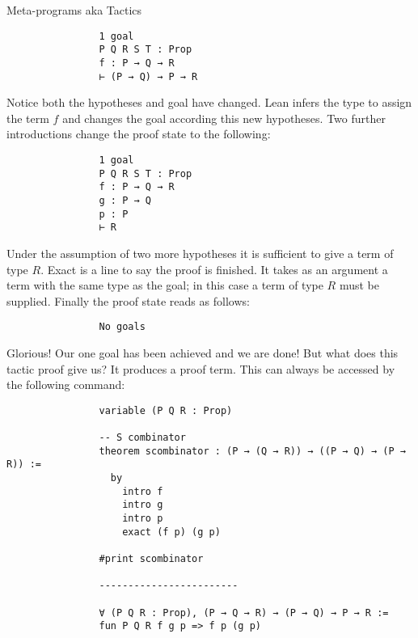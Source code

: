 \documentclass{book}
\begin{document}
\begin{eg}{Meta-programs aka Tactics}
        \begin{center}
            \begin{lstlisting}
                1 goal
                P Q R S T : Prop
                f : P → Q → R
                ⊢ (P → Q) → P → R
            \end{lstlisting}
        \end{center}

        Notice both the hypotheses and goal have changed. Lean infers the type to assign the term $f$ and changes the goal according this new hypotheses. Two further introductions change the proof state to the following: 

        \begin{center}
            \begin{lstlisting}
                1 goal
                P Q R S T : Prop
                f : P → Q → R
                g : P → Q
                p : P
                ⊢ R
            \end{lstlisting}
        \end{center}        
        
        Under the assumption of two more hypotheses it is sufficient to give a term of type $R$. Exact is a line to say the proof is finished. It takes as an argument a term with the same type as the goal; in this case a term of type $R$ must be supplied. Finally the proof state reads as follows: 

        \begin{center}
            \begin{lstlisting}
                No goals    
            \end{lstlisting}
        \end{center}        
        
        Glorious! Our one goal has been achieved and we are done! But what does this tactic proof give us? It produces a proof term. This can always be accessed by the following command: 

        \begin{center}
            \begin{lstlisting}
                variable (P Q R : Prop)

                -- S combinator
                theorem scombinator : (P → (Q → R)) → ((P → Q) → (P → R)) :=
                  by
                    intro f
                    intro g
                    intro p
                    exact (f p) (g p)
                
                #print scombinator 

                ------------------------
                
                ∀ (P Q R : Prop), (P → Q → R) → (P → Q) → P → R :=
                fun P Q R f g p => f p (g p)
            \end{lstlisting}            
        \end{center}    
    \end{eg}
\end{document}
